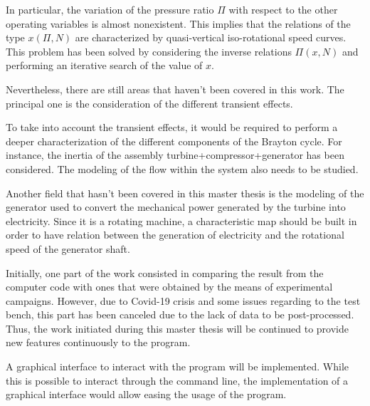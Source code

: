In particular, the variation of the pressure ratio $\Pi$ with respect to the other operating variables is almost nonexistent. This implies that the relations of the type $x(\Pi,N)$ are characterized by quasi-vertical iso-rotational speed curves. This problem has been solved by considering the inverse relations $\Pi(x,N)$ and performing an iterative search of the value of $x$.


Nevertheless, there are still areas that haven't been covered in this work. The principal one is the consideration of the different transient effects. 

To take into account the transient effects, it would be required to perform a deeper characterization of the different components of the Brayton cycle. For instance, the inertia of the assembly turbine+compressor+generator has been considered. The modeling of the flow within the system also needs to be studied.

Another field that hasn't been covered in this master thesis is the modeling of the generator used to convert the mechanical power generated by the turbine into electricity. Since it is a rotating machine, a characteristic map should be built in order to have relation between the generation of electricity and the rotational speed of the generator shaft.


Initially, one part of the work consisted in comparing the result from the computer code with ones that were obtained by the means of experimental campaigns. However, due to Covid-19 crisis and some issues regarding to the test bench, this part has been canceled due to the lack of data to be post-processed. Thus, the work initiated during this master thesis will be continued to provide new features continuously to the program. 

A graphical interface to interact with the program will be implemented. While this is possible to interact through the command line, the implementation of a graphical interface would allow easing the usage of the program.


